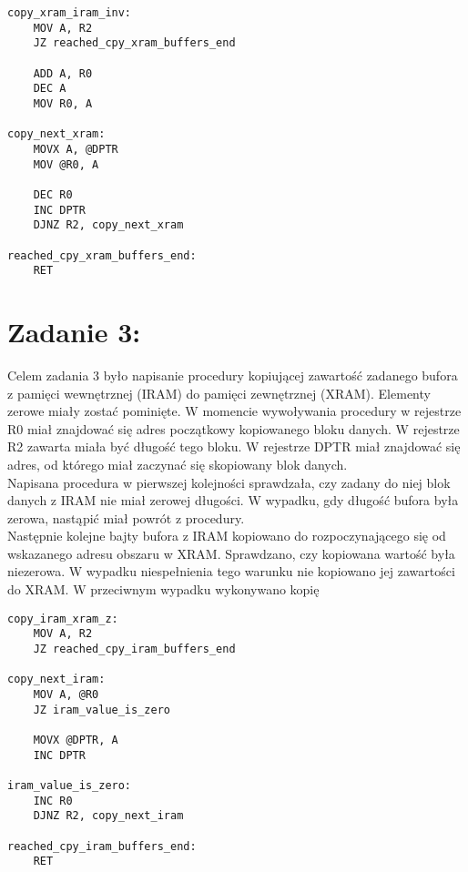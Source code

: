 \documentclass[a4paper,12pt]{article}
\begin{document}
\newpage
\begin{lstlisting}[frame=single, basicstyle=\small, caption={Kod z zadania 2}, label={lst.zad2}]
copy_xram_iram_inv:	
	MOV A, R2
	JZ reached_cpy_xram_buffers_end
	
	ADD A, R0
	DEC A
	MOV R0, A

copy_next_xram:
	MOVX A, @DPTR
	MOV @R0, A
	
	DEC R0
	INC DPTR
	DJNZ R2, copy_next_xram
	
reached_cpy_xram_buffers_end:
	RET
\end{lstlisting}
\vspace{5mm}

\section{Zadanie 3:}
Celem zadania 3 było napisanie procedury kopiującej zawartość zadanego bufora z pamięci wewnętrznej (IRAM) do pamięci zewnętrznej (XRAM). Elementy zerowe miały zostać pominięte. W momencie wywoływania procedury w rejestrze R0 miał znajdować się adres początkowy kopiowanego bloku danych. W rejestrze R2 zawarta miała być długość tego bloku. W rejestrze DPTR miał znajdować się adres, od którego miał zaczynać się skopiowany blok danych.\\

\noindent
Napisana procedura w pierwszej kolejności sprawdzała, czy zadany do niej blok danych z IRAM nie miał zerowej długości. W wypadku, gdy długość bufora była zerowa, nastąpić miał powrót z procedury.\\

\noindent
Następnie kolejne bajty bufora z IRAM kopiowano do rozpoczynającego się od wskazanego adresu obszaru w XRAM. Sprawdzano, czy kopiowana wartość była niezerowa. W wypadku niespełnienia tego warunku nie kopiowano jej zawartości do XRAM. W przeciwnym wypadku wykonywano kopię\\

\begin{lstlisting}[frame=single, basicstyle=\small, caption={Kod z zadania 3}, label={lst.zad3}]
copy_iram_xram_z:
	MOV A, R2
	JZ reached_cpy_iram_buffers_end

copy_next_iram:
	MOV A, @R0
	JZ iram_value_is_zero 
	
	MOVX @DPTR, A
	INC DPTR

iram_value_is_zero:
	INC R0
	DJNZ R2, copy_next_iram
	
reached_cpy_iram_buffers_end:
	RET
\end{lstlisting}
\vspace{5mm}
\end{document}
